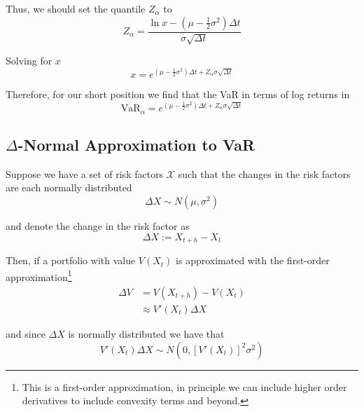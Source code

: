 \documentclass[12pt]{article}
\newlength\tindent
\renewcommand{\indent}{\hspace*{\tindent}}
\begin{document}
Thus, we should set the quantile $Z_\alpha$ to 
\begin{equation*}
	Z_\alpha  = \frac{ \ln x - \left( \mu - \frac{1}{2}\sigma^2 \right) \Delta t }{ \sigma\sqrt{\Delta t}}
\end{equation*}

Solving for $x$
\begin{equation*}
	x = e^{(\mu - \frac{1}{2}\sigma^2)\Delta t + Z_\alpha\sigma\sqrt{\Delta t}}
\end{equation*}

Therefore, for our short position we find that the VaR in terms of log returns in
\begin{equation*}
	\text{VaR}_\alpha = e^{(\mu - \frac{1}{2}\sigma^2)\Delta t + Z_\alpha\sigma\sqrt{\Delta t}}
\end{equation*}

\indent {\em ``This wasn't the most intuitive way to derive this solution, normally we would use a $\Delta$-Normal approximation to VaR.''}

\subsection{$\Delta$-Normal Approximation to VaR}

\indent Suppose we have a set of risk factors $\mathcal X$ such that the changes in the risk factors are each normally distributed
\begin{equation*}
	\Delta X \sim N \left(\mu, \sigma^2 \right)
\end{equation*}

and denote the change in the risk factor as
\begin{equation*}
	\Delta X := X_{t + h} - X_t
\end{equation*}

Then, if a portfolio with value $V(X_t)$ is approximated with the first-order approximation\footnote{This is a first-order approximation, in principle we can include higher order derivatives to include convexity terms and beyond.}
\begin{align*}
	\Delta V &= V(X_{t + h}) - V(X_t) \\
	&\approx V'(X_t) \Delta X
\end{align*}

and since $\Delta X$ is normally distributed we have that
\begin{equation*}
	V'(X_t)\Delta X \sim N \left(0, [V'(X_t)]^2\sigma^2 \right)
\end{equation*}
\end{document}
